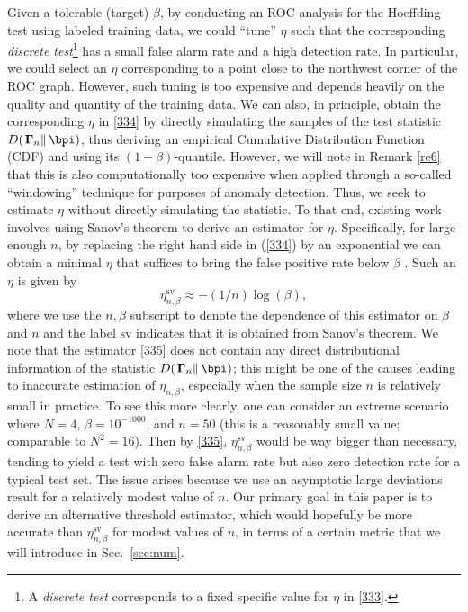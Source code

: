\documentclass[10pt, twocolumn]{IEEEtran}
\begin{document}
{Given a tolerable (target) $\beta$, by conducting an ROC analysis for the Hoeffding test using labeled training
  data, we could ``tune'' $\eta$ such that the corresponding \emph{discrete test}\footnote{A \emph{discrete test} corresponds to a fixed specific value for $\eta$ in \eqref{333}.} \cite{fawcett2006introduction} has a small false alarm rate and a high detection rate. In particular, we could select an $\eta$ corresponding to a point close to the northwest corner of the ROC graph. However, such tuning is too
  expensive and depends heavily on the quality and quantity of the
  training data. We can also, in principle, obtain the corresponding
  $\eta$ in \eqref{334} by directly simulating the samples of the test
  statistic $D( {\left. {{\boldsymbol{\Gamma}_n}} \right\|{{\bpi}}} ) $,
  thus deriving an empirical Cumulative Distribution Function (CDF) and
  using its $(1 - \beta)$-quantile. However, we will note in Remark
  \ref{re6} that this is also computationally too expensive when applied
  through a so-called ``windowing'' technique for purposes of anomaly
  detection. Thus, we seek to estimate $\eta$ without directly
  simulating the statistic. To that end, existing work involves using
  Sanov's theorem \cite{dembo1998large} to derive an estimator for
  $\eta$. Specifically, for large enough $n$, by replacing the right
  hand side in (\ref{334}) by an exponential we can obtain a minimal
  $\eta$ that suffices to bring the false positive rate below $\beta$
  \cite{pas-sma-ton-09,robust-anomaly-tcns}. Such an $\eta$ is given by}
\begin{equation}
  {\eta_{n,\beta}^{\text{sv}} \approx - (1/n) \log ( {{\beta}})}, \label{335}
\end{equation}
{where we use the $n,\beta$ subscript to denote the dependence of
  this estimator on $\beta$ and $n$ and the label $\text{sv}$ indicates
  that it is obtained from Sanov's theorem. We note that the estimator
  \eqref{335} does not contain any direct distributional information of
  the statistic $D( {\left. {{\boldsymbol{\Gamma} _n}}
    \right\|{{\bpi}}})$; this might be one of the causes leading to
  inaccurate estimation of $\eta_{n,\beta}$, especially when the sample
  size $n$ is relatively small in practice. To see this more clearly,
  one can consider an extreme scenario where $N = 4$, $\beta =
  10^{-1000}$, and $n = 50$ (this is a reasonably small value;
  comparable to $N^2 = 16$). Then by \eqref{335},
  $\eta_{n,\beta}^{\text{sv}}$ would be way bigger than necessary,
  tending to yield a test with zero false alarm rate but also zero
  detection rate for a typical test set. The issue arises because we use
  an asymptotic large deviations result for a relatively modest value of
  $n$.  Our primary goal in this paper is to derive an alternative
  threshold estimator, which would hopefully be more accurate than
  $\eta_{n,\beta}^{\text{sv}}$ for modest values of $n$, in terms of a
  certain metric that we will introduce in Sec.~\ref{sec:num}.}
\end{document}
